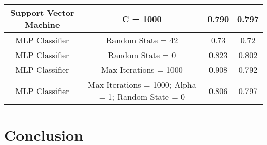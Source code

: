 \documentclass[12pt]{article}
\begin{document}
{\begin{landscape}
\begin{table}[]
\begin{tabular}{|c|c|c|c|}
Support Vector Machine & C = 1000                                           & 0.790              & 0.797             \\ \hline
MLP Classifier         & Random State = 42                                  & 0.73               & 0.72              \\ \hline
MLP Classifier         & Random State = 0                                   & 0.823              & 0.802             \\ \hline
MLP Classifier         & Max Iterations = 1000                              & 0.908              & 0.792             \\ \hline
MLP Classifier         & Max Iterations = 1000; Alpha = 1; Random State = 0 & 0.806              & 0.797             \\ \hline
\end{tabular}
\end{table}
\label{table:2}
\end{landscape}
\clearpage
}



\newpage
\section{Conclusion}
\newpage

\end{document}
